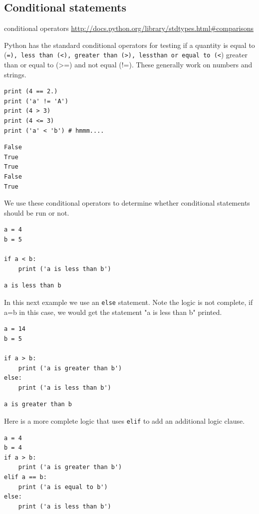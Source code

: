 \documentclass[11pt]{article}
\begin{document}
\subsection{Conditional statements}
\label{sec:orga6c3021}
conditional operators \url{http://docs.python.org/library/stdtypes.html\#comparisons}

Python has the standard conditional operators for testing if a quantity is equal to (\texttt{=), less than (<), greater than (>), lessthan or equal to (<}) greater than or equal to (>=) and not equal (!=). These generally work on numbers and strings.

\begin{verbatim}
print (4 == 2.)
print ('a' != 'A')
print (4 > 3)
print (4 <= 3)
print ('a' < 'b') # hmmm....
\end{verbatim}

\begin{verbatim}
False
True
True
False
True
\end{verbatim}

We use these conditional operators to determine whether conditional statements should be run or not.

\begin{verbatim}
a = 4
b = 5

if a < b:
    print ('a is less than b')
\end{verbatim}

\begin{verbatim}
a is less than b
\end{verbatim}

In this next example we use an \texttt{else} statement. Note the logic is not complete, if a=b in this case, we would get the statement "a is less than b" printed.
\begin{verbatim}
a = 14
b = 5

if a > b:
    print ('a is greater than b')
else:
    print ('a is less than b')
\end{verbatim}

\begin{verbatim}
a is greater than b
\end{verbatim}

Here is a more complete logic that uses \texttt{elif} to add an additional logic clause.
\begin{verbatim}
a = 4
b = 4
if a > b:
    print ('a is greater than b')
elif a == b:
    print ('a is equal to b')
else:
    print ('a is less than b')
\end{verbatim}
\end{document}
